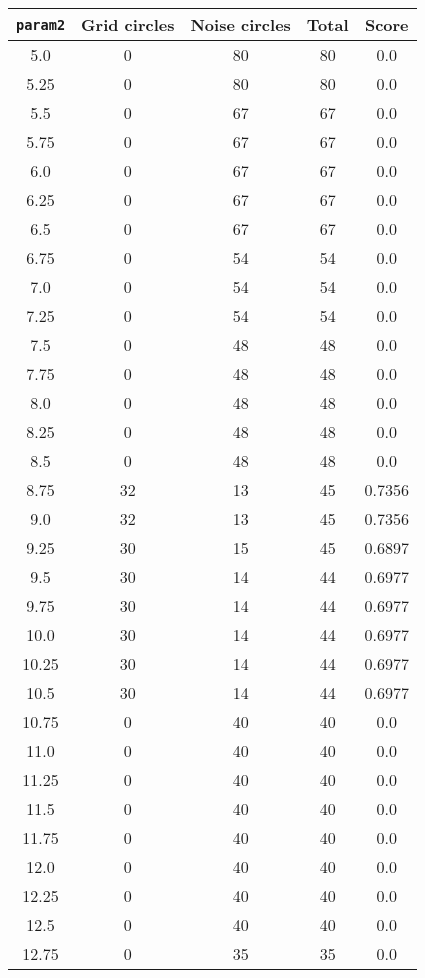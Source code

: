 \documentclass[letterpaper, 12pt]{article}
\begin{document}
\begin{longtable}{|c|c|c|c|c|}
\hline
\textbf{\texttt{param2}} & \textbf{Grid circles} & \textbf{Noise circles} & \textbf{Total} & \textbf{Score} \\
\hline
5.0 & 0 & 80 & 80 & 0.0 \\
\hline
5.25 & 0 & 80 & 80 & 0.0 \\
\hline
5.5 & 0 & 67 & 67 & 0.0 \\
\hline
5.75 & 0 & 67 & 67 & 0.0 \\
\hline
6.0 & 0 & 67 & 67 & 0.0 \\
\hline
6.25 & 0 & 67 & 67 & 0.0 \\
\hline
6.5 & 0 & 67 & 67 & 0.0 \\
\hline
6.75 & 0 & 54 & 54 & 0.0 \\
\hline
7.0 & 0 & 54 & 54 & 0.0 \\
\hline
7.25 & 0 & 54 & 54 & 0.0 \\
\hline
7.5 & 0 & 48 & 48 & 0.0 \\
\hline
7.75 & 0 & 48 & 48 & 0.0 \\
\hline
8.0 & 0 & 48 & 48 & 0.0 \\
\hline
8.25 & 0 & 48 & 48 & 0.0 \\
\hline
8.5 & 0 & 48 & 48 & 0.0 \\
\hline
8.75 & 32 & 13 & 45 & 0.7356 \\
\hline
9.0 & 32 & 13 & 45 & 0.7356 \\
\hline
9.25 & 30 & 15 & 45 & 0.6897 \\
\hline
9.5 & 30 & 14 & 44 & 0.6977 \\
\hline
9.75 & 30 & 14 & 44 & 0.6977 \\
\hline
10.0 & 30 & 14 & 44 & 0.6977 \\
\hline
10.25 & 30 & 14 & 44 & 0.6977 \\
\hline
10.5 & 30 & 14 & 44 & 0.6977 \\
\hline
10.75 & 0 & 40 & 40 & 0.0 \\
\hline
11.0 & 0 & 40 & 40 & 0.0 \\
\hline
11.25 & 0 & 40 & 40 & 0.0 \\
\hline
11.5 & 0 & 40 & 40 & 0.0 \\
\hline
11.75 & 0 & 40 & 40 & 0.0 \\
\hline
12.0 & 0 & 40 & 40 & 0.0 \\
\hline
12.25 & 0 & 40 & 40 & 0.0 \\
\hline
12.5 & 0 & 40 & 40 & 0.0 \\
\hline
12.75 & 0 & 35 & 35 & 0.0 \\

\end{longtable}
\end{document}
